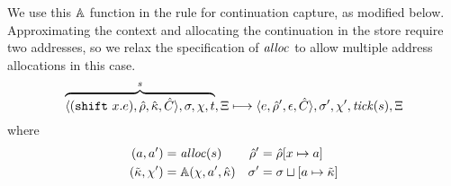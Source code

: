 We use this ${\mathbb A}$ function in the rule for continuation capture, as modified below.
%
Approximating the context and allocating the continuation in the store require two addresses, so we relax the specification of $\mathit{alloc}$ to allow multiple address allocations in this case.
\begin{equation*} \overbrace{\langle (\texttt{shift}\ x. e),\hat{\rho},\hat{\kappa},\hat{C} \rangle,\sigma,\chi,t}^{s},\Xi \longmapsto
  \langle e,\hat{\rho}',\epsilon,\hat{C} \rangle,\sigma',\chi',\mathit{tick}(s),\Xi
\end{equation*}
where
\begin{align*}
  (a,a') &= \mathit{alloc}(s) & \hat{\rho}' &= \hat{\rho}[x \mapsto a] \\
  (\tilde{\kappa},\chi') &= {\mathbb A}(\chi,a',\hat{\kappa}) &
  \sigma' &= \sigma\sqcup[a \mapsto \tilde{\kappa}]
\end{align*}


